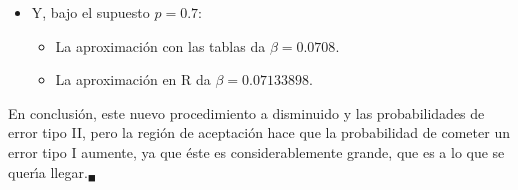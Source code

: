 \begin{solucion}
\begin{itemize}
  \item Y, bajo el supuesto $p = 0.7$:
  \begin{itemize}
   \item La aproximaci\'on con las tablas da $\beta = 0.0708$.
   \item La aproximaci\'on en R da $\beta = 0.07133898$.
  \end{itemize}
 \end{itemize}
 En conclusi\'on, este nuevo procedimiento a disminuido y las probabilidades de error tipo II, pero la regi\'on de aceptaci\'on hace que la probabilidad de cometer un error tipo I aumente, ya que \'este es considerablemente grande, que es a lo que se quer\'{\i}a llegar.${}_{\blacksquare}$
\end{solucion}

